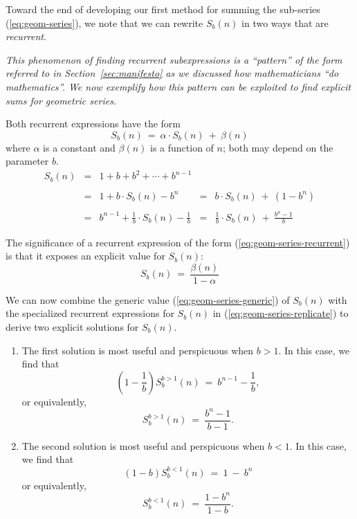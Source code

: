 \bigskip

Toward the end of developing our first method for summing the
sub-series (\ref{eq:geom-series}), we note that we can rewrite
$S_b(n)$ in two ways that are {\em recurrent}.

\bigskip

{\em This phenomenon of {\em finding recurrent subexpressions} is a
  ``pattern'' of the form referred to in Section~\ref{sec:manifesto}
  as we discussed how mathematicians ``do mathematics''.  We now
  exemplify how this pattern can be exploited to find explicit sums
  for geometric series.}

\bigskip

Both recurrent expressions have the form
\begin{equation}
\label{eq:geom-series-recurrent}
S_b(n) \ = \ \alpha \cdot S_b(n) \ + \ \beta(n)
\end{equation}
where $\alpha$ is a constant and $\beta(n)$ is a function of $n$; both
may depend on the parameter $b$.
\begin{equation}
\label{eq:geom-series-replicate}
\begin{array}{cclcl}
S_{b}(n) 
  & = &
1+ b + b^2 + \cdots + b^{n-1} & & \\
  &   &   &  & \\
  & = &
1 + b \cdot S_{b}(n) - b^n
   & = & b \cdot S_{b}(n) \ + \ (1 - b^n) \\
  &   &   &  & \\
  & = &
{\displaystyle
b^{n-1} + \frac{1}{b} \cdot S_{b}(n) - \frac{1}{b}
}
  & = &
{\displaystyle \frac{1}{b} \cdot S_{b}(n) \ + \ \frac{b^n -1}{b} 
}
\end{array}
\end{equation}

The significance of a recurrent expression of the form
(\ref{eq:geom-series-recurrent}) is that it exposes an explicit value
for $S_b(n)$:
\begin{equation}
\label{eq:geom-series-generic}
S_b(n) \ = \ \frac{\beta(n)}{1 - \alpha}
\end{equation}

We can now combine the generic value (\ref{eq:geom-series-generic}) of
$S_b(n)$ with the specialized recurrent expressions for $S_b(n)$ in
(\ref{eq:geom-series-replicate}) to derive two explicit solutions for
$S_b(n)$.
\begin{enumerate}
\item
The first solution is most useful and perspicuous when $b>1$.  In this
case, we find that
\[ \left( 1 - \frac{1}{b} \right)  S^{b>1}_{b}(n) \ = \ b^{n-1} -
\frac{1}{b}, \] or equivalently,
\begin{equation}
\label{eq:geom-sum:b>1}
S^{b>1}_{b}(n) \ = \ \frac{b^{n}- 1}{b - 1}.
\end{equation}

\item
The second solution is most useful and perspicuous when $b < 1$.  In this
case, we find that
\[ (1-b) S^{b<1}_{b}(n) \ = \ 1 \ - \ b^n \]
or equivalently,
\begin{equation}
\label{eq:geom-sum:b<1}
S^{b<1}_{b}(n) \ = \ \frac{1 - b^n}{1-b}.
\end{equation}
\end{enumerate}

